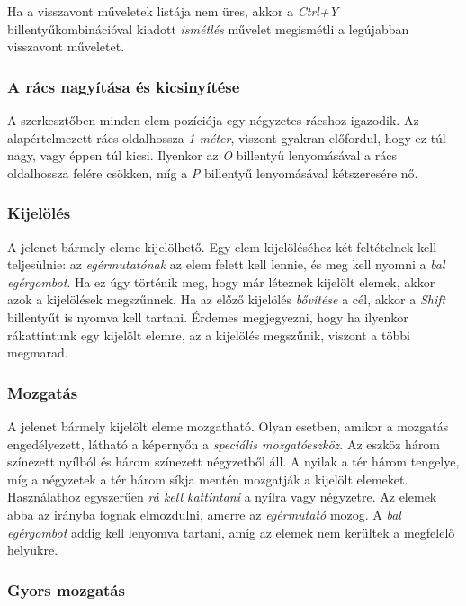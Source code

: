 Ha a visszavont műveletek listája nem üres, akkor a \emph{Ctrl+Y} billentyűkombinációval kiadott
\emph{ismétlés} művelet megismétli a legújabban visszavont műveletet.

\subsubsection{A rács nagyítása és kicsinyítése}

A szerkesztőben minden elem pozíciója egy négyzetes rácshoz igazodik. Az alapértelmezett rács
oldalhossza \emph{1 méter}, viszont gyakran előfordul, hogy ez túl nagy, vagy éppen túl kicsi.
Ilyenkor az \emph{O} billentyű lenyomásával a rács oldalhossza felére csökken, míg a \emph{P}
billentyű lenyomásával kétszeresére nő.

\subsubsection{Kijelölés}

A jelenet bármely eleme kijelölhető. Egy elem kijelöléséhez két feltételnek kell teljesülnie: az
\emph{egérmutatónak} az elem felett kell lennie, és meg kell nyomni a \emph{bal egérgombot}. Ha ez
úgy történik meg, hogy már léteznek kijelölt elemek, akkor azok a kijelölések megszűnnek. Ha az
előző kijelölés \emph{bővítése} a cél, akkor a \emph{Shift} billentyűt is nyomva kell tartani.
Érdemes megjegyezni, hogy ha ilyenkor rákattintunk egy kijelölt elemre, az a kijelölés megszűnik,
viszont a többi megmarad.

\subsubsection{Mozgatás}

A jelenet bármely kijelölt eleme mozgatható. Olyan esetben, amikor a mozgatás engedélyezett,
látható a képernyőn a \emph{speciális mozgatóeszköz}. Az eszköz három színezett nyílból és három
színezett négyzetből áll. A nyilak a tér három tengelye, míg a négyzetek a tér három síkja mentén
mozgatják a kijelölt elemeket. Használathoz egyszerűen \emph{rá kell kattintani} a nyílra vagy
négyzetre. Az elemek abba az irányba fognak elmozdulni, amerre az \emph{egérmutató} mozog. A
\emph{bal egérgombot} addig kell lenyomva tartani, amíg az elemek nem kerültek a megfelelő helyükre.

\subsubsection{Gyors mozgatás}

